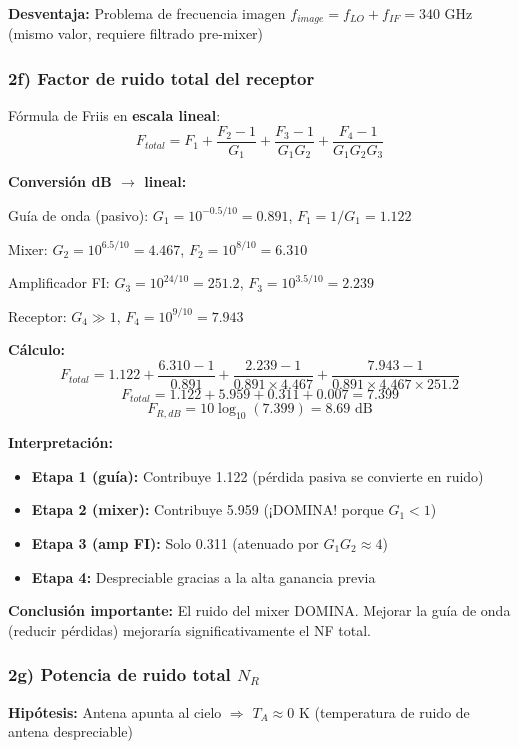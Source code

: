 \documentclass[a4paper,10pt]{article}
\begin{document}
\textbf{Desventaja:} Problema de frecuencia imagen $f_{image} = f_{LO} + f_{IF} = 340$ GHz (mismo valor, requiere filtrado pre-mixer)

\subsubsection{2f) Factor de ruido total del receptor}

Fórmula de Friis en \textbf{escala lineal}:
$$F_{total} = F_1 + \frac{F_2-1}{G_1} + \frac{F_3-1}{G_1 G_2} + \frac{F_4-1}{G_1 G_2 G_3}$$

\textbf{Conversión dB $\rightarrow$ lineal:}

Guía de onda (pasivo): $G_1 = 10^{-0.5/10} = 0.891$, $F_1 = 1/G_1 = 1.122$

Mixer: $G_2 = 10^{6.5/10} = 4.467$, $F_2 = 10^{8/10} = 6.310$

Amplificador FI: $G_3 = 10^{24/10} = 251.2$, $F_3 = 10^{3.5/10} = 2.239$

Receptor: $G_4 \gg 1$, $F_4 = 10^{9/10} = 7.943$

\textbf{Cálculo:}
$$F_{total} = 1.122 + \frac{6.310-1}{0.891} + \frac{2.239-1}{0.891 \times 4.467} + \frac{7.943-1}{0.891 \times 4.467 \times 251.2}$$
$$F_{total} = 1.122 + 5.959 + 0.311 + 0.007 = 7.399$$
$$\boxed{F_{R,dB} = 10\log_{10}(7.399) = 8.69 \text{ dB}}$$

\textbf{Interpretación:}
\begin{itemize}
    \item \textbf{Etapa 1 (guía):} Contribuye 1.122 (pérdida pasiva se convierte en ruido)
    \item \textbf{Etapa 2 (mixer):} Contribuye 5.959 (¡DOMINA! porque $G_1 < 1$)
    \item \textbf{Etapa 3 (amp FI):} Solo 0.311 (atenuado por $G_1 G_2 \approx 4$)
    \item \textbf{Etapa 4:} Despreciable gracias a la alta ganancia previa
\end{itemize}

\textbf{Conclusión importante:} El ruido del mixer DOMINA. Mejorar la guía de onda (reducir pérdidas) mejoraría significativamente el NF total.

\subsubsection{2g) Potencia de ruido total $N_R$}

\textbf{Hipótesis:} Antena apunta al cielo $\Rightarrow$ $T_A \approx 0$ K (temperatura de ruido de antena despreciable)
\end{document}
